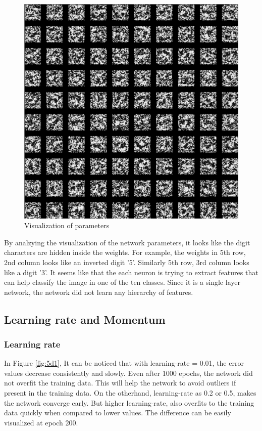 \documentclass{article}
\begin{document}
\begin{figure}[!h]
  \centering
  \includegraphics[width=\textwidth]{figures/5c}
  \caption{Visualization of parameters}
  \label{fig:5c}
\end{figure}

By analzying the visualization of the network parameters, it looks like the digit characters are hidden inside the weights. For example, the weights in 5th row, 2nd column looks like an inverted digit '5'. Similarly 5th row, 3rd column looks like a digit '3'. It seems like that the each neuron is trying to extract features that can help classify the image in one of the ten classes. Since it is a single layer network, the network did not learn any hierarchy of features.

\subsection{Learning rate and Momentum}

\subsubsection*{Learning rate}
In Figure \ref{fig:5d1}, It can be noticed that with learning-rate = 0.01, the error values decrease consistently and slowly. Even after 1000 epochs, the network did not overfit the training data. This will help the network to avoid outliers if present in the training data. On the otherhand, learning-rate as 0.2 or 0.5, makes the network converge early. But higher learning-rate, also overfits to the training data quickly when compared to lower values. The difference can be easily visualized at epoch 200.
\end{document}
